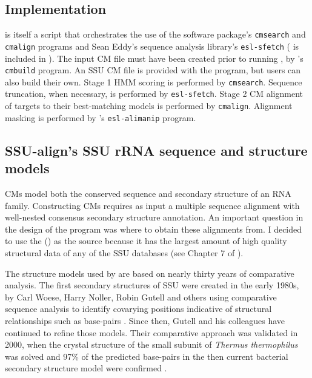 \subsection{Implementation}

 is itself a  script that orchestrates the
use of the  software package's \texttt{cmsearch} and
\texttt{cmalign} programs \cite{infernal} and Sean Eddy's 
sequence analysis library's \texttt{esl-sfetch} ( is
included in ).  The input CM file must have been created
prior to running , by 's \texttt{cmbuild}
program. An SSU CM file is provided with the program, but users can
also build their own. Stage 1 HMM scoring is performed by
\texttt{cmsearch}. Sequence truncation, when necessary, is performed
by \texttt{esl-sfetch}. Stage 2 CM alignment of targets to their
best-matching models is performed by \texttt{cmalign}. Alignment
masking is performed by 's \texttt{esl-alimanip} program. 

\subsection{SSU-align's SSU rRNA sequence and structure models}

CMs model both the conserved sequence and secondary structure of an
RNA family. Constructing CMs requires as input a multiple sequence
alignment with well-nested consensus secondary structure
annotation. An important question in the design of the 
program was where to obtain these alignments from. I decided to use
the  () \cite{CannoneGutell02} as
the source because it has the largest amount of high quality
structural data of any of the SSU databases (see
Chapter 7 of \cite{Nawrocki09b}).

The structure models used by  are based on nearly thirty years of
comparative analysis. The first secondary structures of SSU were
created in the early 1980s, by Carl Woese, Harry Noller, Robin Gutell
and others using comparative sequence analysis to identify covarying
positions indicative of structural relationships such as base-pairs
\cite{Woese80,Noller81,Woese83}. Since then, Gutell and his
colleagues have continued to refine those models. Their comparative
approach was validated in 2000, when the crystal structure of the
small subunit of \emph{Thermus thermophilus} was solved
\cite{Wimberly00} and 97\% of the predicted base-pairs in the then
current bacterial secondary structure model were confirmed
\cite{Gutell02}.

